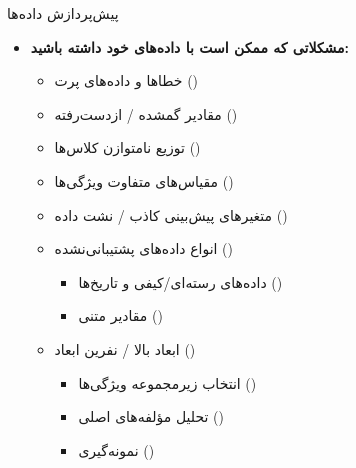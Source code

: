 \begin{frame}{پیش‌پردازش داده‌ها}
\begin{itemize}
  \item \textbf{مشکلاتی که ممکن است با داده‌های خود داشته باشید:}
  \begin{itemize}
    \item خطاها و داده‌های پرت ()
    \item مقادیر گمشده / ازدست‌رفته ()
    \item توزیع نامتوازن کلاس‌ها ()
    \item مقیاس‌های متفاوت ویژگی‌ها ()
    \item متغیرهای پیش‌بینی کاذب / نشت داده ()
    \item انواع داده‌های پشتیبانی‌نشده ()
    \begin{itemize}
      \item داده‌های رسته‌ای/کیفی و تاریخ‌ها ()
      \item مقادیر متنی ()
    \end{itemize}
    \item ابعاد بالا / نفرین ابعاد ()
    \begin{itemize}
      \item انتخاب زیرمجموعه ویژگی‌ها ()
      \item تحلیل مؤلفه‌های اصلی ()
      \item نمونه‌گیری ()
    \end{itemize}
  \end{itemize}
\end{itemize}
\end{frame}
